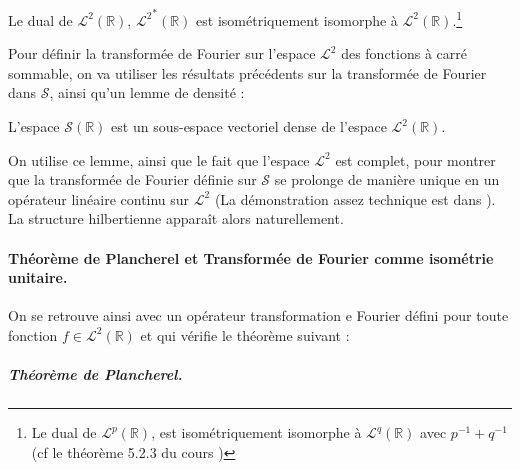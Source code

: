 \begin{Prop}
    Le dual de $\mathcal L^2(\mathbb R)$, ${\mathcal L^2}^\ast(\mathbb R)$  est isométriquement isomorphe à $\mathcal L^2(\mathbb R)$.\footnote{Le dual de $\mathcal L^p(\mathbb R)$,  est isométriquement isomorphe à $\mathcal L^q(\mathbb R)$ avec $p^{-1} + q^{-1}$ (cf le théorème 5.2.3 du cours \cite{BabadjianChap5})}
\end{Prop}



Pour définir la transformée de Fourier sur l'espace $\mathcal L^2$ des fonctions à carré sommable, on va utiliser les résultats précédents sur la transformée de Fourier dans $\mathcal S$, ainsi qu'un lemme de densité :

\begin{Lemm} L'espace $\mathcal S(\mathbb R)$ est un sous-espace vectoriel dense de l'espace $\mathcal L^2(\mathbb R)$.
\end{Lemm}

On utilise ce lemme, ainsi que le fait que l’espace $\mathcal L^2$ est complet, pour montrer que la transformée de Fourier définie sur $\mathcal S$ se prolonge de manière unique en un opérateur linéaire continu sur $\mathcal L^2$ (La démonstration assez technique est dans \cite{AppelMathPhysiciens}). La structure hilbertienne apparaît alors naturellement.

\medskip

\paragraph{Théorème de Plancherel et Transformée de Fourier comme isométrie unitaire.}



On se retrouve ainsi avec un opérateur \guillemotleft{} transformation e Fourier \guillemotright{} défini pour toute fonction $f \in  \mathcal L^2(\mathbb R )$ et qui vérifie le théorème suivant :

\subparagraph{Théorème de Plancherel.}

